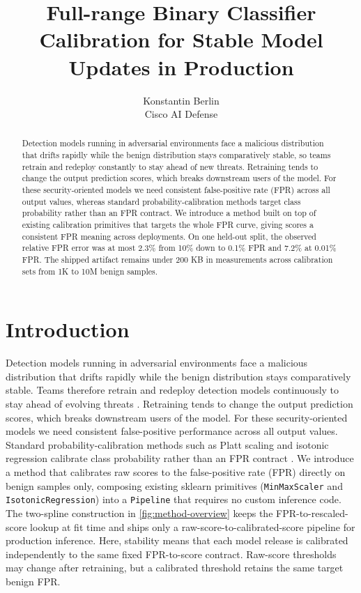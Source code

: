 \documentclass{article}
\title{Full-range Binary Classifier Calibration for Stable Model Updates in Production}
\author{%
  Konstantin Berlin \\
  Cisco AI Defense \\
}
\date{}
\begin{document}
\maketitle

\begin{abstract}
  Detection models running in adversarial environments face a malicious distribution that drifts rapidly while the benign distribution stays comparatively stable, so teams retrain and redeploy constantly to stay ahead of new threats.
  Retraining tends to change the output prediction scores, which breaks downstream users of the model.
  For these security-oriented models we need consistent false-positive rate (FPR) across all output values, whereas standard probability-calibration methods target class probability rather than an FPR contract.
  We introduce a method built on top of existing calibration primitives that targets the whole FPR curve, giving scores a consistent FPR meaning across deployments.
  On one held-out split, the observed relative FPR error was at most 2.3\% from 10\% down to 0.1\% FPR and 7.2\% at 0.01\% FPR.
  The shipped artifact remains under 200 KB in measurements across calibration sets from 1K to 10M benign samples.
\end{abstract}

\section{Introduction}
\label{sec:intro}

Detection models running in adversarial environments face a malicious distribution that drifts rapidly while the benign distribution stays comparatively stable.
Teams therefore retrain and redeploy detection models continuously to stay ahead of evolving threats \citep{swanda2025}.
Retraining tends to change the output prediction scores, which breaks downstream users of the model.
For these security-oriented models we need consistent false-positive performance across all output values.
Standard probability-calibration methods such as Platt scaling and isotonic regression calibrate class probability rather than an FPR contract \citep{platt2000,zadrozny2002}.
We introduce a method that calibrates raw scores to the false-positive rate (FPR) directly on benign samples only, composing existing sklearn primitives (\texttt{MinMaxScaler} and \texttt{IsotonicRegression}) into a \texttt{Pipeline} that requires no custom inference code.
The two-spline construction in \cref{fig:method-overview} keeps the FPR-to-rescaled-score lookup at fit time and ships only a raw-score-to-calibrated-score pipeline for production inference.
Here, stability means that each model release is calibrated independently to the same fixed FPR-to-score contract.
Raw-score thresholds may change after retraining, but a calibrated threshold retains the same target benign FPR.
\end{document}
